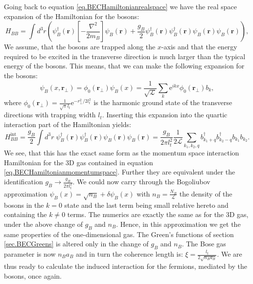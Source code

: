 Going back to equation \eqref{eq.BECHamiltonianrealspace} we have the real space expansion of the Hamiltonian for the bosons:
\begin{equation}
H_{BB} = \int d^3 r \left(\psi_B^\dagger(\mathbf{r})\left[-\frac{\nabla^2}{2m_B}\right]\psi_B(\mathbf{r}) + \frac{g_B}{2}\psi_B^\dagger(\mathbf{r})\psi_B^\dagger(\mathbf{r})\psi_B(\mathbf{r})\psi_B(\mathbf{r})  \right), \nonumber
\end{equation}
We assume, that the bosons are trapped along the $x$-axis and that the energy required to be excited in the transverse direction is much larger than the typical energy of the bosons. This means, that we can make the following expansion for the bosons:
\begin{equation}
\psi_B(x, \mathbf{r}_{\perp}) = \phi_0(\mathbf{r}_{\perp}) \psi_B(x) = \frac{1}{\sqrt{\mathcal{L}}} \sum_k \text{e}^{ikx} \phi_0(\mathbf{r}_{\perp}) b_k, 
\nonumber
\end{equation}
where $\phi_0(\mathbf{r}_\perp) = \frac{1}{\sqrt{\pi}l_t}\text{e}^{-r_{\perp}^2/2l_t^2}$ is the harmonic ground state of the transverse directions with trapping width $l_t$. Inserting this expansion into the quartic interaction part of the Hamiltonian yields:
\begin{equation}
H_{BB}^{\text{int}} = \frac{g_B}{2}\int d^3 r \; \psi_B^\dagger(\mathbf{r})\psi_B^\dagger(\mathbf{r})\psi_B(\mathbf{r})\psi_B(\mathbf{r}) = \frac{g_B}{2\pi l_t^2}\frac{1}{2\mathcal{L}}\sum_{k_1,k_2,q} b^\dagger_{k_1 + q}b^\dagger_{k_2 - q}b_{k_1}b_{k_2}. \nonumber
\end{equation}
We see, that this has the exact same form as the momentum space interaction Hamiltonian for the 3D gas contained in equation \eqref{eq.BECHamiltonianmomentumspace}. Further they are equivalent under the identification $g_B \to \frac{g_B}{2\pi l_t^2}$. We could now carry through the Bogoliubov approximation $\psi_B(x) = \sqrt{n_B} + \delta\psi_B(x)$ with $n_B = \frac{N_B}{\mathcal{L}}$ the density of the bosons in the $k = 0$ state and the last term being small relative hereto and containing the $k \neq 0$ terms. The numerics are exactly the same as for the 3D gas, under the above change of $g_B$ and $n_B$. Hence, in this approximation we get the same properties of the one-dimensional gas. The Green's functions of section \ref{sec.BECGreens} is altered only in the change of $g_B$ and $n_B$. The Bose gas parameter is now $n_Ba_B$ and in turn the coherence length is: $\xi = \frac{l_t}{2\sqrt{n_Ba_B}}$. We are thus ready to calculate the induced interaction for the fermions, mediated by the bosons, once again.

